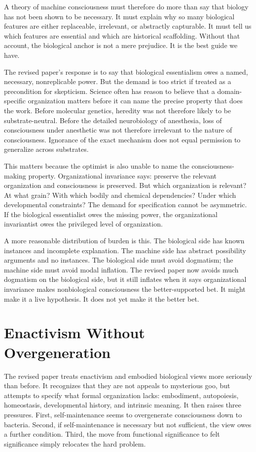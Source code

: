 \documentclass[11pt]{article}
\begin{document}
A theory of machine consciousness must therefore do more than say that biology has not been shown to be necessary. It must explain why so many biological features are either replaceable, irrelevant, or abstractly capturable. It must tell us which features are essential and which are historical scaffolding. Without that account, the biological anchor is not a mere prejudice. It is the best guide we have.

The revised paper's response is to say that biological essentialism owes a named, necessary, nonreplicable power. But the demand is too strict if treated as a precondition for skepticism. Science often has reason to believe that a domain-specific organization matters before it can name the precise property that does the work. Before molecular genetics, heredity was not therefore likely to be substrate-neutral. Before the detailed neurobiology of anesthesia, loss of consciousness under anesthetic was not therefore irrelevant to the nature of consciousness. Ignorance of the exact mechanism does not equal permission to generalize across substrates.

This matters because the optimist is also unable to name the consciousness-making property. Organizational invariance says: preserve the relevant organization and consciousness is preserved. But which organization is relevant? At what grain? With which bodily and chemical dependencies? Under which developmental constraints? The demand for specification cannot be asymmetric. If the biological essentialist owes the missing power, the organizational invariantist owes the privileged level of organization.

A more reasonable distribution of burden is this. The biological side has known instances and incomplete explanation. The machine side has abstract possibility arguments and no instances. The biological side must avoid dogmatism; the machine side must avoid modal inflation. The revised paper now avoids much dogmatism on the biological side, but it still inflates when it says organizational invariance makes nonbiological consciousness the better-supported bet. It might make it a live hypothesis. It does not yet make it the better bet.

\section{Enactivism Without Overgeneration}

The revised paper treats enactivism and embodied biological views more seriously than before. It recognizes that they are not appeals to mysterious goo, but attempts to specify what formal organization lacks: embodiment, autopoiesis, homeostasis, developmental history, and intrinsic meaning. It then raises three pressures. First, self-maintenance seems to overgenerate consciousness down to bacteria. Second, if self-maintenance is necessary but not sufficient, the view owes a further condition. Third, the move from functional significance to felt significance simply relocates the hard problem.
\end{document}
